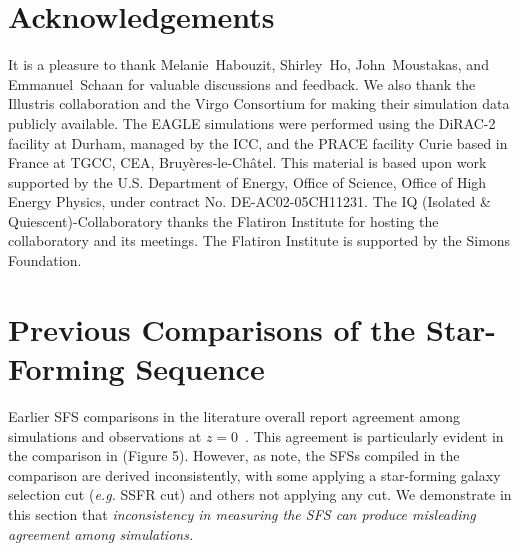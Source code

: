 \documentclass[tighten, preprint]{aastex62}
\begin{document}
\section*{Acknowledgements}
It is a pleasure to thank
	Melanie~Habouzit,
	Shirley~Ho, 
    John~Moustakas,
    and 
	Emmanuel~Schaan 
for valuable discussions and feedback. 
We also thank the Illustris collaboration and the Virgo Consortium for making 
their simulation data publicly available. The EAGLE simulations were performed 
using the DiRAC-2 facility at Durham, managed by the ICC, and the PRACE facility 
Curie based in France at TGCC, CEA, Bruy\`{e}res-le-Ch\^{a}tel.
This material is based upon work supported by the U.S. Department
of Energy, Office of Science, Office of High Energy Physics, under
contract No. DE-AC02-05CH11231. The IQ (Isolated \& Quiescent)-Collaboratory thanks the Flatiron Institute for hosting the collaboratory 
and its meetings. The Flatiron Institute is supported by the Simons Foundation.
\appendix
{}

\section{Previous Comparisons of the Star-Forming Sequence} \label{app:literature}
Earlier SFS comparisons in the literature overall report agreement among 
simulations and observations at $z=0$~\citep[\emph{e.g.}][]{genel2014, somerville2015, sparre2015, schaye2015, bluck2016, dave2016}. 
This agreement is particularly evident in the comparison in 
\cite{somerville2015} (Figure 5). However, as \cite{somerville2015} note, 
the SFSs compiled in the comparison are derived inconsistently, with some 
applying a star-forming galaxy selection cut (\emph{e.g.} SSFR cut) and 
others not applying any cut. We demonstrate in this section that {\em inconsistency 
in measuring the SFS can produce misleading agreement among simulations.} 
\end{document}
